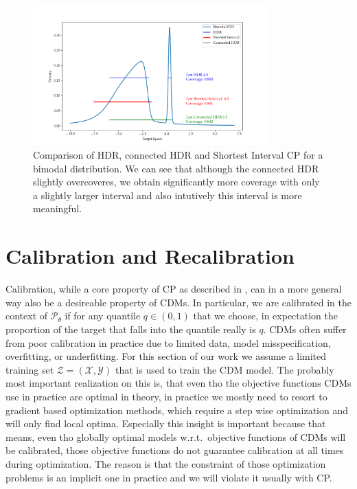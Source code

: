\begin{figure}
    \centering
    \includegraphics[width=0.8\textwidth]{resources/bimodal_distribution_hdr_vs_shortest_interval.png}
    \caption[Comparison of HDR, connected HDR and Shortest Interval CP]{Comparison of HDR, connected HDR and Shortest Interval CP for a bimodal distribution. We can see that although the connected HDR slightly overcoveres, we obtain significantly more coverage with only a slightly larger interval and also intutively this interval is more meaningful.}\label{fig:hdr_vs_shortest_intervals}
\end{figure}

\section{Calibration and Recalibration}\label{sec:calibration}

Calibration, while a core property of CP as described in , can in a more general way also be a desireable property of CDMs. In particular, we are calibrated in the context of $\mathscr{P}_\theta$ if for any quantile $q\in(0,1)$ that we choose, in expectation the proportion of the target that falls into the quantile really is $q$. CDMs often suffer from poor calibration in practice due to limited data, model misspecification, overfitting, or underfitting. For this section of our work we assume a limited training set $\mathcal{Z} = (\mathcal{X}, \mathcal{Y})$ that is used to train the CDM model. The probably most important realization on this is, that even tho the objective functions CDMs use in practice are optimal in theory, in practice we mostly need to resort to gradient based optimization methods, which require a step wise optimization and will only find local optima. Especially this insight is important because that means, even tho globally optimal models w.r.t.\ objective functions of CDMs will be calibrated, those objective functions do not guarantee calibration at all times during optimization. The reason is that the constraint of those optimization problems is an implicit one in practice and we will violate it usually with CP.\@

